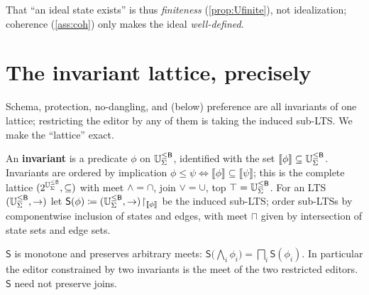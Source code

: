 \documentclass[../uxoxo-main]{subfiles}
\begin{document}
That ``an ideal state exists'' is thus \emph{finiteness}
(\cref{prop:Ufinite}), not idealization; coherence (\cref{ass:coh}) only makes
the ideal \emph{well-defined}.

\section{The invariant lattice, precisely}\label{sec:lattice}
Schema, protection, no-dangling, and (below) preference are all invariants of
one lattice; restricting the editor by any of them is taking the induced sub-LTS.
We make the ``lattice'' exact.

\begin{definition}\label{def:invlat}
An \textbf{invariant} is a predicate $\phi$ on $\mathbb{U}_{\Sigma}^{\le \mathsf{B}}$, identified with the set
$\llbracket\phi\rrbracket\subseteq\mathbb{U}_{\Sigma}^{\le \mathsf{B}}$. Invariants are ordered by implication
$\phi\le\psi\iff\llbracket\phi\rrbracket\subseteq\llbracket\psi\rrbracket$; this
is the complete lattice $(2^{\mathbb{U}_{\Sigma}^{\le \mathsf{B}}},\subseteq)$ with meet $\wedge=\cap$, join
$\vee=\cup$, top $\top=\mathbb{U}_{\Sigma}^{\le \mathsf{B}}$. For an LTS $(\mathbb{U}_{\Sigma}^{\le \mathsf{B}},\to)$ let
$\mathsf S(\phi)\coloneqq(\mathbb{U}_{\Sigma}^{\le \mathsf{B}},\to)\!\restriction_{\llbracket\phi\rrbracket}$ be
the induced sub-LTS; order sub-LTSs by componentwise inclusion of states and
edges, with meet $\sqcap$ given by intersection of state sets and edge sets.
\end{definition}

\begin{theorem}\label{thm:latticehom}
$\mathsf S$ is monotone and preserves arbitrary meets:
$\mathsf S\!\bigl(\bigwedge_i\phi_i\bigr)=\bigsqcap_i\mathsf S(\phi_i)$. In
particular the editor constrained by two invariants is the meet of the two
restricted editors. $\mathsf S$ need not preserve joins.
\end{theorem}
\end{document}
